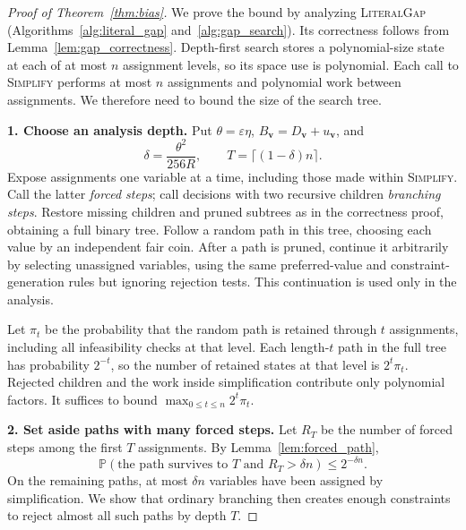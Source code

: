 \documentclass[11pt,a4paper]{article}
\theoremstyle{definition}
\theoremstyle{remark}
\newcommand{\Prb}{\mathbb P}
\begin{document}
\begin{proof}[Proof of Theorem~\ref{thm:bias}]
We prove the bound by analyzing \textnormal{\textsc{LiteralGap}}
(Algorithms~\ref{alg:literal_gap} and~\ref{alg:gap_search}).
Its correctness follows from Lemma~\ref{lem:gap_correctness}.
Depth-first search stores a polynomial-size state at each of at most $n$
assignment levels, so its space use is polynomial. Each call to
\textnormal{\textsc{Simplify}} performs at most $n$ assignments and polynomial work
between assignments. We therefore need to bound the size of the search tree.

\par\medskip\noindent\textbf{1. Choose an analysis depth.} 
Put $\theta=\varepsilon\eta$, $B_{\mathbf v}=D_{\mathbf v}+u_{\mathbf v}$,
and
\[
 \delta=\frac{\theta^2}{256R},\qquad
 T=\lceil(1-\delta)n\rceil.
\]
Expose assignments one variable at a time, including those made within
\textnormal{\textsc{Simplify}}. Call the latter \emph{forced steps}; call decisions with
two recursive children \emph{branching steps}. Restore missing children
and pruned subtrees as in the correctness proof, obtaining a full binary
tree. Follow a random path in this tree, choosing each value by an
independent fair coin. After a path is pruned, continue it arbitrarily by
selecting unassigned variables, using the same preferred-value and
constraint-generation rules but ignoring rejection tests. This continuation
is used only in the analysis.

Let $\pi_t$ be the probability that the random path is retained through
$t$ assignments, including all infeasibility checks at that level. Each
length-$t$ path in the full tree has probability $2^{-t}$, so the number of
retained states at that level is $2^t\pi_t$. Rejected children and the work
inside simplification contribute only polynomial factors. It suffices to
bound $\max_{0\le t\le n}2^t\pi_t$.

\par\medskip\noindent\textbf{2. Set aside paths with many forced steps.} 
Let $R_T$ be the number of forced steps among the first $T$ assignments.
By Lemma~\ref{lem:forced_path},
\[
 \Prb(\text{the path survives to }T\text{ and }R_T>\delta n)
 \le 2^{-\delta n}.
\]
On the remaining paths, at most $\delta n$ variables have been assigned
by simplification. We show that ordinary branching then creates enough
constraints to reject almost all such paths by depth $T$.


\end{proof}
\end{document}
